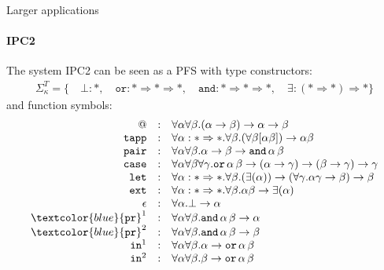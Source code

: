 \documentclass[10pt,presentation,color=names]{beamer}
\newcommand{\arrkind}{\Rightarrow}
\newcommand{\arrtype}{\rightarrow}
\newcommand{\symb}[1]{\textcolor{blue}{\mathtt{#1}}}
\newcommand{\proj}{\symb{pr}}
\begin{document}
\begin{frame}{Larger applications}
  \framesubtitle{IPC2}

  The system IPC2 can be seen as a PFS with type constructors:
  \[
  \begin{array}{c}
    \Sigma^T_\kappa = \{\quad
    \bot : *,\quad
    \mathtt{or} : * \arrkind * \arrkind *,\quad
    \mathtt{and} : * \arrkind * \arrkind *,\quad
    \exists : (* \arrkind *) \arrkind *
    \}
  \end{array}
  \]
  and function symbols:
  \[
  \begin{array}{rcl}
    @ & : & \forall \alpha \forall \beta . (\alpha \arrtype \beta) \arrtype \alpha \arrtype \beta \\

    \mathtt{tapp} & : & \forall \alpha : * \arrkind * . \forall \beta .
    (\forall \beta [\alpha \beta]) \arrtype \alpha \beta \\

    \mathtt{pair} & : & \forall \alpha \forall \beta . \alpha \arrtype \beta \arrtype
    \mathtt{and}\, \alpha\, \beta \\

    \mathtt{case} & : & \forall \alpha \forall \beta \forall \gamma . \mathtt{or}\, \alpha\, \beta \arrtype
    (\alpha \arrtype \gamma) \arrtype (\beta \arrtype \gamma) \arrtype \gamma \\

    \mathtt{let} & : & \forall \alpha : * \arrkind * . \forall \beta .
    (\exists (\alpha)) \arrtype
    (\forall \gamma . \alpha \gamma \arrtype \beta) \arrtype \beta \\

    \mathtt{ext} & : & \forall \alpha : * \arrkind * . \forall \beta . \alpha \beta \arrtype
    \exists (\alpha) \\

    \epsilon & : & \forall \alpha . \bot \arrtype \alpha \\

    \proj^1 & : & \forall \alpha \forall \beta . \mathtt{and}\, \alpha\, \beta \arrtype \alpha \\

    \proj^2 & : & \forall \alpha \forall \beta . \mathtt{and}\, \alpha\, \beta \arrtype \beta \\

    \mathtt{in}^1 & : & \forall \alpha \forall \beta . \alpha \arrtype
    \mathtt{or}\, \alpha\, \beta \\

    \mathtt{in}^2 & : & \forall \alpha \forall \beta . \beta \arrtype
    \mathtt{or}\, \alpha\, \beta \\
  \end{array}
  \]
\end{frame}
\end{document}
